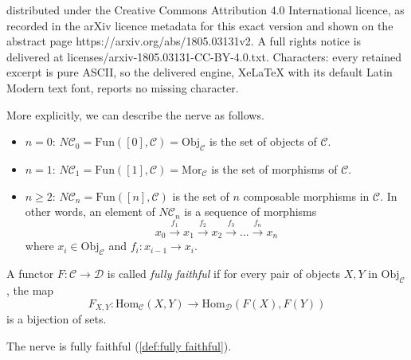 \documentclass[10pt,a4paper]{amsart}
\newcommand{\Fun}{\mathrm{Fun}}
\newcommand{\Hom}{\mathrm{Hom}}
\newcommand{\Mor}{\mathrm{Mor}}
\newcommand{\Obj}{\mathrm{Obj}}
\newcommand{\cC}{\mathcal{C}}
\newcommand{\cD}{\mathcal{D}}
\begin{document}
distributed under the Creative Commons Attribution 4.0 International licence, as recorded in the arXiv licence metadata for this exact version and shown on the abstract page https://arxiv.org/abs/1805.03131v2. A full rights notice is delivered at licenses/arxiv-1805.03131-CC-BY-4.0.txt. Characters: every retained excerpt is pure ASCII, so the delivered engine, XeLaTeX with its default Latin Modern text font, reports no missing character.
\begin{remark} \label{rem:nerve explicit}
  More explicitly, we can describe the nerve as follows. 
  \begin{itemize}
    \item $n = 0$: $N\cC_0 = \Fun([0],\cC) = \Obj_{\cC}$ is the set of objects of $\cC$.
    \item $n = 1$: $N\cC_1 = \Fun([1],\cC) = \Mor_{\cC}$ is the set of morphisms of $\cC$.
    \item $n \geq 2$: $N\cC_n = \Fun([n],\cC)$ is the set of $n$ composable morphisms in $\cC$. In other words, an element of $N\cC_n$ is a sequence of morphisms
    \[x_0 \xrightarrow{f_1} x_1 \xrightarrow{f_2} x_2 \xrightarrow{f_3} ... \xrightarrow{f_n} x_n\]
    where $x_i \in \Obj_\cC$ and $f_i\colon x_{i-1} \to x_i$.
  \end{itemize}
\end{remark}

\begin{definition} \label{def:fully faithful}
  A functor $F\colon \cC \to \cD$ is called \emph{fully faithful} if for every pair of objects $X,Y$ in $\Obj_{\cC}$, the map 
  \[
  F_{X,Y}\colon \Hom_{\cC}(X,Y) \to \Hom_{\cD}(F(X),F(Y))
  \]
  is a bijection of sets.
\end{definition}

\begin{proposition} \label{prop:nerve fully faithful}
 The nerve is fully faithful (\cref{def:fully faithful}).
\end{proposition}
\end{document}
